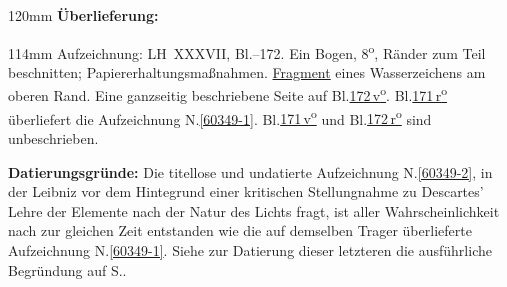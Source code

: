 %
\frenchspacing%
\begin{ledgroupsized}[r]{120mm}%
\footnotesize%
\pstart%
\noindent\textbf{Überlieferung:}%
\pend%
\end{ledgroupsized}%
\begin{ledgroupsized}[r]{114mm}%
\footnotesize%
\pstart%
\parindent -6mm%
%
Aufzeichnung:
LH~XXXVII, Bl.--172.
Ein Bogen, 8\textsuperscript{o},
Ränder zum Teil beschnitten;
Papiererhaltungsmaßnahmen.
\href{\Scan{LH_37_05_171-172wz}}{Fragment} eines Wasserzeichens am oberen Rand.
Eine ganzseitig beschriebene Seite auf Bl.\;\href{\Scan{LH_37_05_172v}}{172\,v\textsuperscript{o}}.
Bl.\;\href{\Scan{LH_37_05_171r}}{171\,r\textsuperscript{o}} überliefert die Aufzeichnung N.\;\ref{60349-1}.
Bl.\;\href{\Scan{LH_37_05_171v}}{171\,v\textsuperscript{o}} und
Bl.\;\href{\Scan{LH_37_05_172r}}{172\,r\textsuperscript{o}} sind unbeschrieben.
\pend%
\end{ledgroupsized}%
\vspace{5mm}%
\begin{ledgroup}%
\footnotesize%
\pstart%
\noindent%
\textbf{Datierungsgründe:}
Die titellose und undatierte Aufzeichnung N.\;\ref{60349-2}, in der Leibniz vor dem Hintegrund einer kritischen Stellungnahme zu Descartes' Lehre der Elemente nach der Natur des Lichts fragt, ist aller Wahrscheinlichkeit nach zur gleichen Zeit entstanden wie die auf demselben Trager überlieferte Aufzeichnung N.\;\ref{60349-1}.
Siehe zur Datierung dieser letzteren die ausführliche Begründung auf S.\;\pageref{60349-1_dat}.
\pend%
\end{ledgroup}%
%
\frenchspacing%
\vspace{8mm}%
\normalsize%
\pstart%
\noindent%
